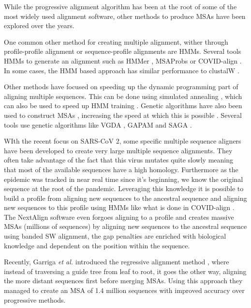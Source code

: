 \documentclass[
  11pt,
  twoside,
  BCOR=10mm,
  listof=totoc]{scrbook}
\begin{document}
While the progressive alignment algorithm has been at the root of some of the most widely used alignment software, other methods to produce MSAs have been explored over the years.

One common other method for creating multiple alignment, wither through profile-profile alignment or sequence-profile alignments are HMMs. Several tools HMMs to generate an alignment such as HMMer \autocite{finnHMMERWebServer2011}, MSAProbs \autocite{liuMSAProbsMultipleSequence2010} or COVID-align \autocite{lemoineCOVIDAlignAccurateOnline2020}. In some cases, the HMM based approach has similar performance to clustalW \autocite{eddyMultipleAlignmentUsing}.

Other methods have focused on speeding up the dynamic programming part of aligning multiple sequences. This can be done using simulated annealing \autocite{kimMultipleSequenceAlignment1994,ishikawaMultipleSequenceAlignment1993,huoSimulatedAnnealingAlgorithm2007}, which can also be used to speed up HMM training \autocite{eddyMultipleAlignmentUsing}. Genetic algorithms have also been used to construct MSAs \autocite{chowdhuryReviewMultipleSequence2017}, increasing the speed at which this is possible \autocite{zhangGeneticAlgorithmMultiple1997}. Several tools use genetic algorithms like VGDA \autocite{nazninVerticalDecompositionGenetic2011}, GAPAM \autocite{nazninProgressiveAlignmentMethod2012} and SAGA \autocite{notredameSAGASequenceAlignment1996}.

WIth the recent focus on SARS-CoV 2, some specific multiple sequence aligners have been developed to create very large multiple sequence alignments. They often take advantage of the fact that this virus mutates quite slowly meaning that most of the available sequences have a high homology. Furthermore as the epidemic was tracked in near real time since it's beginning, we know the original sequence at the root of the pandemic. Leveraging this knowledge it is possible to build a profile from aligning new sequences to the ancestral sequence and aligning new sequences to this profile using HMMs like what is done in COVID-align \autocite{lemoineCOVIDAlignAccurateOnline2020}. The NextAlign \autocite{aksamentovNextcladeCladeAssignment2021} software even forgoes aligning to a profile and creates massive MSAs (millions of sequences) by aligning new sequences to the ancestral sequence using banded SW alignment, the gap penalties are enriched with biological knowledge and dependent on the position within the sequence.

Recently, Garriga \emph{et al.} introduced the regressive alignment method \autocite{garrigaLargeMultipleSequence2019}, where instead of traversing a guide tree from leaf to root, it goes the other way, aligning the more distant sequences first before merging MSAs. Using this approach they managed to create an MSA of 1.4 million sequences with improved accuracy over progressive methods.
\end{document}
